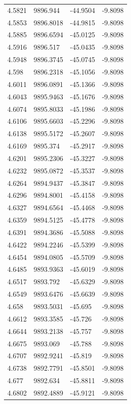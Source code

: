 \begin{table}[H]
\begin{tabular}{llll}
4.5821 & 9896.944 & -44.9504 & -9.8098 \\
4.5853 & 9896.8018 & -44.9815 & -9.8098 \\
4.5885 & 9896.6594 & -45.0125 & -9.8098 \\
4.5916 & 9896.517 & -45.0435 & -9.8098 \\
4.5948 & 9896.3745 & -45.0745 & -9.8098 \\
4.598 & 9896.2318 & -45.1056 & -9.8098 \\
4.6011 & 9896.0891 & -45.1366 & -9.8098 \\
4.6043 & 9895.9463 & -45.1676 & -9.8098 \\
4.6074 & 9895.8033 & -45.1986 & -9.8098 \\
4.6106 & 9895.6603 & -45.2296 & -9.8098 \\
4.6138 & 9895.5172 & -45.2607 & -9.8098 \\
4.6169 & 9895.374 & -45.2917 & -9.8098 \\
4.6201 & 9895.2306 & -45.3227 & -9.8098 \\
4.6232 & 9895.0872 & -45.3537 & -9.8098 \\
4.6264 & 9894.9437 & -45.3847 & -9.8098 \\
4.6296 & 9894.8001 & -45.4158 & -9.8098 \\
4.6327 & 9894.6564 & -45.4468 & -9.8098 \\
4.6359 & 9894.5125 & -45.4778 & -9.8098 \\
4.6391 & 9894.3686 & -45.5088 & -9.8098 \\
4.6422 & 9894.2246 & -45.5399 & -9.8098 \\
4.6454 & 9894.0805 & -45.5709 & -9.8098 \\
4.6485 & 9893.9363 & -45.6019 & -9.8098 \\
4.6517 & 9893.792 & -45.6329 & -9.8098 \\
4.6549 & 9893.6476 & -45.6639 & -9.8098 \\
4.658 & 9893.5031 & -45.695 & -9.8098 \\
4.6612 & 9893.3585 & -45.726 & -9.8098 \\
4.6644 & 9893.2138 & -45.757 & -9.8098 \\
4.6675 & 9893.069 & -45.788 & -9.8098 \\
4.6707 & 9892.9241 & -45.819 & -9.8098 \\
4.6738 & 9892.7791 & -45.8501 & -9.8098 \\
4.677 & 9892.634 & -45.8811 & -9.8098 \\
4.6802 & 9892.4889 & -45.9121 & -9.8098 \\

\end{tabular}
\end{table}

